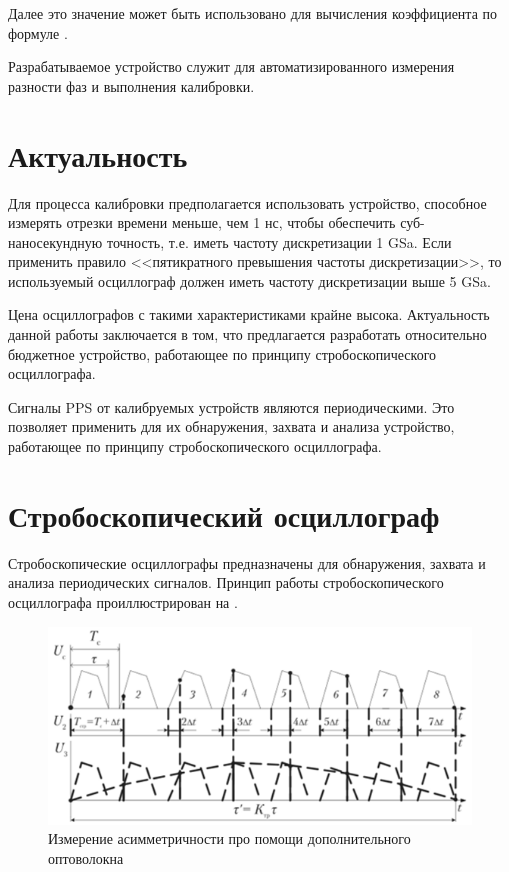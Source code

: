 Далее это значение может быть использовано для вычисления коэффициента по формуле .

Разрабатываемое устройство служит для автоматизированного измерения разности фаз и выполнения калибровки.

\section{Актуальность}

Для процесса калибровки предполагается использовать устройство, способное измерять отрезки времени меньше, чем 1 нс, чтобы обеспечить
суб-наносекундную точность, т.е. иметь частоту дискретизации 1 GSa. Если применить правило <<пятикратного превышения частоты дискретизации>>, то
используемый осциллограф должен иметь частоту дискретизации выше 5 GSa. 

Цена осциллографов с такими характеристиками крайне высока. Актуальность данной работы заключается в том, что предлагается разработать
относительно бюджетное устройство, работающее по принципу стробоскопического осциллографа.
 
Сигналы PPS от калибруемых устройств являются периодическими. Это позволяет применить для их обнаружения, захвата и анализа устройство,
работающее по принципу стробоскопического осциллографа.

\section{Стробоскопический осциллограф}

Стробоскопические осциллографы предназначены для обнаружения, захвата и анализа периодических сигналов.
Принцип работы стробоскопического осциллографа проиллюстрирован на .

\begin{figure}[ht!] 
	\center
	\includegraphics {my_folder/images//stb_osc}
	\caption{Измерение асимметричности про помощи дополнительного оптоволокна} 
	\label{fig:stb-osc}  
\end{figure}

